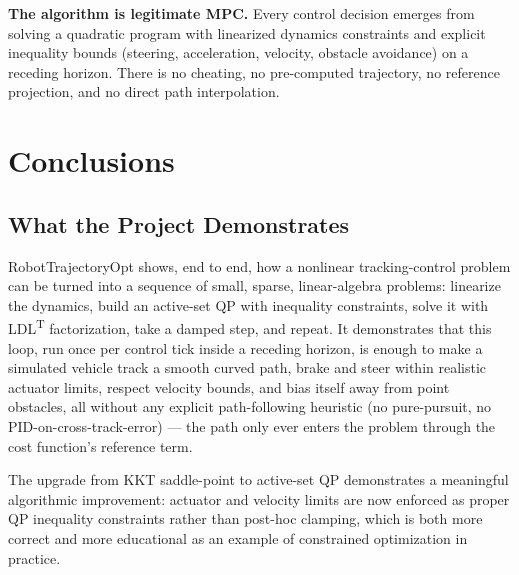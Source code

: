 ﻿\documentclass[11pt,a4paper]{article}
\begin{document}
\textbf{The algorithm is legitimate MPC.} Every control decision emerges from solving a quadratic program with linearized dynamics constraints and explicit inequality bounds (steering, acceleration, velocity, obstacle avoidance) on a receding horizon. There is no cheating, no pre-computed trajectory, no reference projection, and no direct path interpolation.
\section{Conclusions}

\subsection{What the Project Demonstrates}
RobotTrajectoryOpt shows, end to end, how a nonlinear tracking-control problem can be turned into a sequence of small, sparse, linear-algebra problems: linearize the dynamics, build an active-set QP with inequality constraints, solve it with LDL\textsuperscript{T} factorization, take a damped step, and repeat. It demonstrates that this loop, run once per control tick inside a receding horizon, is enough to make a simulated vehicle track a smooth curved path, brake and steer within realistic actuator limits, respect velocity bounds, and bias itself away from point obstacles, all without any explicit path-following heuristic (no pure-pursuit, no PID-on-cross-track-error) --- the path only ever enters the problem through the cost function's reference term.

The upgrade from KKT saddle-point to active-set QP demonstrates a meaningful algorithmic improvement: actuator and velocity limits are now enforced as proper QP inequality constraints rather than post-hoc clamping, which is both more correct and more educational as an example of constrained optimization in practice.
\end{document}
